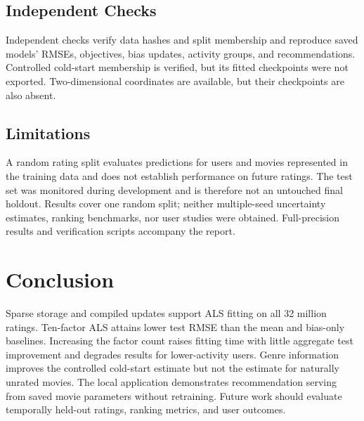 \subsection{Independent Checks}
\label{sec:verification}
Independent checks verify data hashes and split membership and reproduce saved models' RMSEs, objectives, bias updates, activity groups, and recommendations. Controlled cold-start membership is verified, but its fitted checkpoints were not exported. Two-dimensional coordinates are available, but their checkpoints are also absent.

\subsection{Limitations}
A random rating split evaluates predictions for users and movies represented in the training data and does not establish performance on future ratings. The test set was monitored during development and is therefore not an untouched final holdout. Results cover one random split; neither multiple-seed uncertainty estimates, ranking benchmarks, nor user studies were obtained. Full-precision results and verification scripts accompany the report.

\section{Conclusion}
Sparse storage and compiled updates support ALS fitting on all 32 million ratings. Ten-factor ALS attains lower test RMSE than the mean and bias-only baselines. Increasing the factor count raises fitting time with little aggregate test improvement and degrades results for lower-activity users. Genre information improves the controlled cold-start estimate but not the estimate for naturally unrated movies. The local application demonstrates recommendation serving from saved movie parameters without retraining. Future work should evaluate temporally held-out ratings, ranking metrics, and user outcomes.
